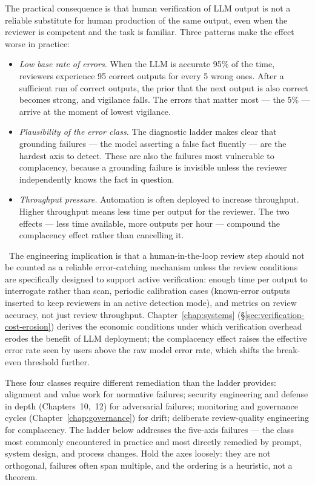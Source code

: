 The practical consequence is that human verification of LLM
output is not a reliable substitute for human production of the
same output, even when the reviewer is competent and the task
is familiar. Three patterns make the effect worse in practice:

\begin{itemize}
  \item \emph{Low base rate of errors.} When the LLM is accurate
        95\% of the time, reviewers experience 95 correct outputs
        for every 5 wrong ones. After a sufficient run of correct
        outputs, the prior that the next output is also correct
        becomes strong, and vigilance falls. The errors that matter
        most --- the 5\% --- arrive at the moment of lowest
        vigilance.
  \item \emph{Plausibility of the error class.} The diagnostic
        ladder makes clear that grounding failures --- the model
        asserting a false fact fluently --- are the hardest axis
        to detect. These are also the failures most vulnerable to
        complacency, because a grounding failure is invisible
        unless the reviewer independently knows the fact in
        question.
  \item \emph{Throughput pressure.} Automation is often deployed
        to increase throughput. Higher throughput means less time
        per output for the reviewer. The two effects --- less time
        available, more outputs per hour --- compound the
        complacency effect rather than cancelling it.
\end{itemize}

\Cons\ The engineering implication is that a human-in-the-loop
review step should not be counted as a reliable error-catching
mechanism unless the review conditions are specifically designed
to support active verification: enough time per output to
interrogate rather than scan, periodic calibration cases
(known-error outputs inserted to keep reviewers in an active
detection mode), and metrics on review accuracy, not just review
throughput. Chapter~\ref{chap:systems} (\S\ref{sec:verification-cost-erosion})
derives the economic conditions under which verification overhead
erodes the benefit of LLM deployment; the complacency effect
raises the effective error rate seen by users above the raw model
error rate, which shifts the break-even threshold further.

These four classes require different remediation than the ladder
provides: alignment and value work for normative failures;
security engineering and defense in depth (Chapters~10,~12) for
adversarial failures; monitoring and governance cycles
(Chapter~\ref{chap:governance}) for drift; deliberate review-quality engineering for
complacency. The ladder below addresses the five-axis failures
--- the class most commonly encountered in practice and most
directly remedied by prompt, system design, and process changes.
Hold the axes loosely: they are not orthogonal, failures often
span multiple, and the ordering is a heuristic, not a theorem.

